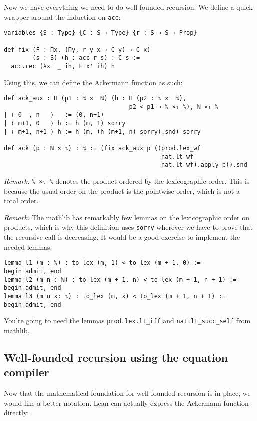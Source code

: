 \documentclass[a4paper, 12pt]{article}
\newcommand{\lean}[1]{\texttt{#1}}
\theoremstyle{changedot}
\theoremstyle{changedotbreak}
\theoremstyle{nonumberplain}
\begin{document}
Now we have everything we need to do well-founded recursion. We define a quick wrapper around the induction on \lean{acc}:

\begin{verbatim}
variables {S : Type} {C : S → Type} {r : S → S → Prop}

def fix (F : Πx, (Πy, r y x → C y) → C x)
        (s : S) (h : acc r s) : C s :=
  acc.rec (λx' _ ih, F x' ih) h
\end{verbatim}

Using this, we can define the Ackermann function as such:

\begin{verbatim}
def ack_aux : Π (p1 : ℕ ×ₗ ℕ) (h : Π (p2 : ℕ ×ₗ ℕ),
                                   p2 < p1 → ℕ ×ₗ ℕ), ℕ ×ₗ ℕ
| ⟨ 0  , n   ⟩ _ := (0, n+1)
| ⟨ m+1, 0   ⟩ h := h (m, 1) sorry
| ⟨ m+1, n+1 ⟩ h := h (m, (h (m+1, n) sorry).snd) sorry

def ack (p : ℕ × ℕ) : ℕ := (fix ack_aux p ((prod.lex_wf
                                            nat.lt_wf
                                            nat.lt_wf).apply p)).snd
\end{verbatim}

\textit{Remark:} \lean{ℕ ×ₗ ℕ} denotes the product ordered by the lexicographic order. This is because the usual order on the product is the pointwise order, which is not a total order.

\textit{Remark:} The mathlib has remarkably few lemmas on the lexicographic order on products, which is why this definition uses \lean{sorry} wherever we have to prove that the recursive call is decreasing. It would be a good exercise to implement the needed lemmas:

\begin{verbatim}
lemma l1 (m : ℕ) : to_lex (m, 1) < to_lex (m + 1, 0) :=
begin admit, end
lemma l2 (m n : ℕ) : to_lex (m + 1, n) < to_lex (m + 1, n + 1) :=
begin admit, end
lemma l3 (m n x: ℕ) : to_lex (m, x) < to_lex (m + 1, n + 1) :=
begin admit, end
\end{verbatim}

You're going to need the lemmas \lean{prod.lex.lt_iff} and \lean{nat.lt_succ_self} from mathlib.

\subsection{Well-founded recursion using the equation compiler}
Now that the mathematical foundation for well-founded recursion is in place, we would like a better notation. Lean can actually express the Ackermann function directly:
\end{document}

